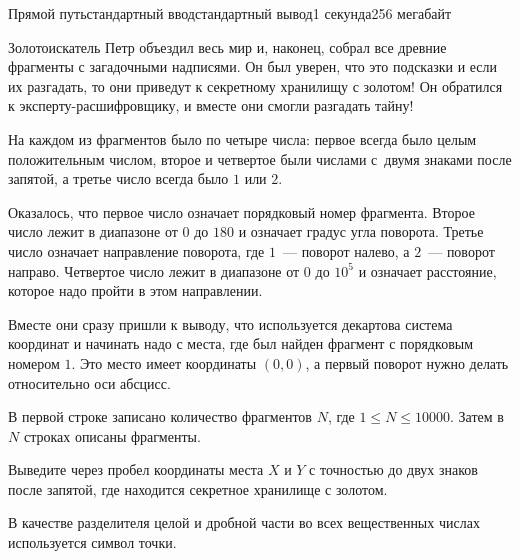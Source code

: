 \begin{problem}[(Иванов В.\,В.)]{Прямой путь}{стандартный ввод}{стандартный вывод}{1 секунда}{256 мегабайт}

Золотоискатель Петр объездил весь мир и, наконец, собрал все древние фрагменты с загадочными надписями. Он был уверен, что это подсказки и если их разгадать, то они приведут к секретному хранилищу с золотом! Он обратился к эксперту-расшифровщику, и вместе они смогли разгадать тайну!

На каждом из фрагментов было по четыре числа: первое всегда было целым положительным числом, второе и четвертое были числами с~двумя знаками после запятой, а третье число всегда было $1$ или $2$.

Оказалось, что первое число означает порядковый номер фрагмента. Второе число лежит в диапазоне от $0$ до $180$ и означает градус угла поворота. Третье число означает направление поворота, где $1$~--- поворот налево, а $2$~--- поворот направо. Четвертое число лежит в диапазоне от $0$ до $10^5$ и означает расстояние, которое надо пройти в этом направлении. 

Вместе они сразу пришли к выводу, что используется декартова система координат и начинать надо с места, где был найден фрагмент с порядковым номером $1$. Это место имеет координаты $(0, 0)$, а первый поворот нужно делать относительно оси абсцисс.

\InputFile
В первой строке записано количество фрагментов $N$, где $1 \leq N \leq 10000$. Затем в $N$ строках описаны фрагменты.

\OutputFile
Выведите через пробел координаты места $X$ и $Y$ с точностью до двух знаков после запятой, где находится секретное хранилище с золотом.

\Example

\begin{example}
%
\end{example}

\Note
В качестве разделителя целой и дробной части во всех вещественных числах используется символ точки.

\end{problem}

